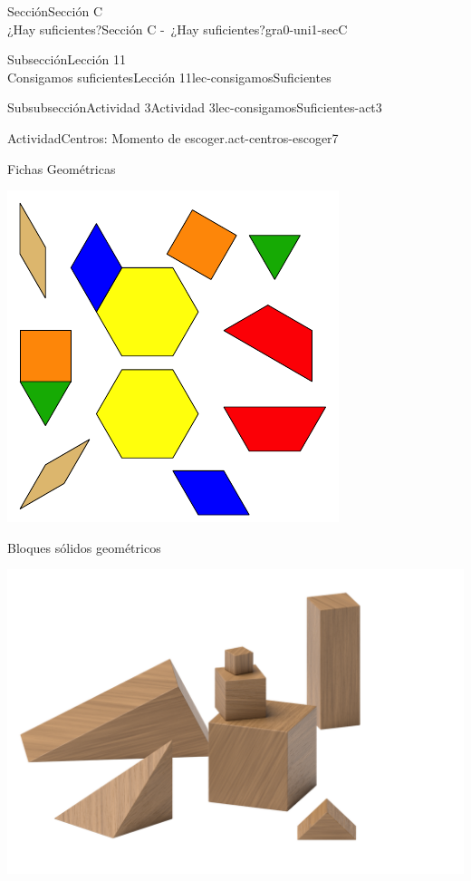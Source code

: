 \begin{sectionptx}{Sección}{{\Large Sección C\\}¿Hay suficientes?}{}{Sección C -~¿Hay suficientes?}{}{}{gra0-uni1-secC}
\begin{subsectionptx}{Subsección}{{\normalsize Lección 11\\[-0.05cm]}Consigamos suficientes}{}{Lección 11}{}{}{lec-consigamosSuficientes}
\begin{subsubsectionptx}{Subsubsección}{Actividad 3}{}{Actividad 3}{}{}{lec-consigamosSuficientes-act3}
\begin{activity}{Actividad}{Centros: Momento de escoger.}{act-centros-escoger7}
\begin{sidebyside}{2}{0.025}{0.025}{0.05}
\begin{sbspanel}{0.45}
\end{sbspanel}%
\begin{sbspanel}{0.45}%
Fichas Geométricas%
\par
\includegraphics[max width=\linewidth, center]{external/svg-source/tikz-file-147344.pdf}
\end{sbspanel}%
\end{sidebyside}%
\begin{sidebyside}{2}{0.025}{0.025}{0.05}%
\begin{sbspanel}{0.45}%
Bloques sólidos geométricos%
\par
\includegraphics[max width=\linewidth, center]{external/png-source/K.1.A Beta Student Workbook.Geoblocks.png}

\end{sbspanel}
\end{sidebyside}
\end{activity}
\end{subsubsectionptx}
\end{subsectionptx}
\end{sectionptx}
